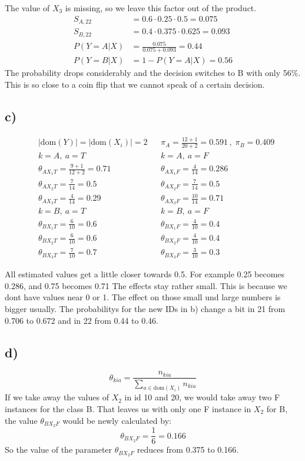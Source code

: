 \documentclass[a4paper]{scrartcl}
\begin{document}
The value of $X_3$ is missing, so we leave this factor out of the product.
\begin{align*}
S_{A,22} &= 0.6 \cdot 0.25 \cdot 0.5 = 0.075 \\
S_{B,22} &= 0.4 \cdot 0.375 \cdot 0.625 = 0.093 \\[0.5em]
P(Y=A|X) &= \frac{0.075}{0.075+0.093} = 0.44 \\
P(Y=B|X) &= 1- P(Y=A|X) = 0.56
\end{align*}
The probability drops considerably and the decision switches to B with only 56\%. This is so close to a coin flip that we cannot speak of a certain decision.

\subsection*{c)}
\begin{align*}
& |\mathrm{dom}(Y)| =|\mathrm{dom}(X_i)| = 2 && \pi_A = \frac{12+1}{20+2} = 0.591\,,\; \pi_B = 0.409 \\[1em]
& k=A,\ a = T && k=A,\ a = F \\
& \theta_{AX_1T} = \tfrac{9+1}{12+2} = 0.71 && \theta_{AX_1F} = \tfrac{4}{14} = 0.286 \\
& \theta_{AX_2T} = \tfrac{7}{14} = 0.5 && \theta_{AX_2F} = \tfrac{7}{14} = 0.5 \\
& \theta_{AX_3T} = \tfrac{4}{14} = 0.29 && \theta_{AX_3F} = \tfrac{10}{14} = 0.71 \\[1em]
& k=B,\ a=T && k=B,\ a=F \\
& \theta_{BX_1T} = \tfrac{6}{10} = 0.6 && \theta_{BX_1F} = \tfrac{4}{10} = 0.4 \\
& \theta_{BX_2T} = \tfrac{6}{10} = 0.6 && \theta_{BX_2F} = \tfrac{4}{10} = 0.4 \\
& \theta_{BX_3T} = \tfrac{7}{10} = 0.7 && \theta_{BX_3F} = \tfrac{3}{10} = 0.3
\end{align*}

All estimated values get a little closer towards 0.5. For example 0.25 becomes 0.286, and 0.75 becomes 0.71
The effects stay rather small. This is because we dont have values near 0 or 1. The effect on those small und large numbers is bigger usually. 
The probabilitys for the new IDs in b) change a bit in 21 from 0.706 to 0.672 and in 22 from 0.44 to 0.46.

\subsection*{d)}\vspace{2mm}
$$\theta_{kia} = \frac{n_{kia}}{\sum_{a\in \mathrm{dom}(X_i)}n_{kia}} $$
If we take away the values of $X_2$ in id 10 and 20, we would take away two F instances for the class B. That leaves us with only one F instance in $X_2$ for B, the value $\theta_{BX_2F}$ would be newly calculated by:
$$\theta_{BX_2F} = \frac{1}{6} = 0.166 $$
So the value of the parameter $\theta_{BX_2F}$ reduces from 0.375 to 0.166.
\end{document}
